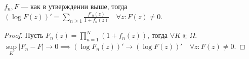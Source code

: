 \begin{consequence}
   $f_n, F$ --- как в утверждении выше, тогда $(\log F(z))' = \sum\limits_{n \ge  1} \frac{f'_n(z)}{1 + f_n(z)}\quad \forall z\!: F(z) \neq 0$.  
\end{consequence}
\begin{proof}
    Пусть $F_n(z) = \prod_{n=1}^{N} (1 + f_n(z))$, тогда $\forall K \Subset \Omega$.  $\sup\limits_{K} \left| F_n - F \right| \to 0 \implies (\log F_n(z))' \to (\log F(z))' \quad \forall z\!: F(z) \neq 0$.
\end{proof}
